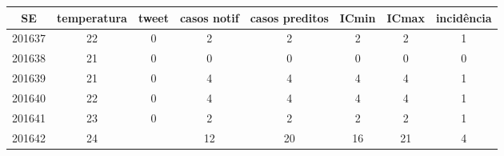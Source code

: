 \begin{tabular}{c|ccccccc}
  \hline
SE & temperatura & tweet & casos notif & casos preditos & ICmin & ICmax & incidência \\ 
  \hline
201637 & 22 & 0 & 2 & 2 & 2 & 2 & 1 \\ 
  201638 & 21 & 0 & 0 & 0 & 0 & 0 & 0 \\ 
  201639 & 21 & 0 & 4 & 4 & 4 & 4 & 1 \\ 
  201640 & 22 & 0 & 4 & 4 & 4 & 4 & 1 \\ 
  201641 & 23 & 0 & 2 & 2 & 2 & 2 & 1 \\ 
  201642 & 24 &  & 12 & 20 & 16 & 21 & 4 \\ 
   \hline
\end{tabular}
